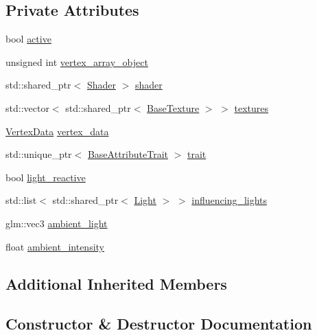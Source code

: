 \subsection*{Private Attributes}
\begin{DoxyCompactItemize}
\item 
bool \hyperlink{class_graphics_1_1_renderable_a5ee90a804fea73ddfaeed77086ecead4}{active}
\item 
unsigned int \hyperlink{class_graphics_1_1_renderable_aabfa91ebff7b10decd54119d663044ef}{vertex\+\_\+array\+\_\+object}
\item 
std\+::shared\+\_\+ptr$<$ \hyperlink{class_graphics_1_1_shader}{Shader} $>$ \hyperlink{class_graphics_1_1_renderable_a6c951dfc9a00d3f3f79550112d0f40e3}{shader}
\item 
std\+::vector$<$ std\+::shared\+\_\+ptr$<$ \hyperlink{class_graphics_1_1_base_texture}{Base\+Texture} $>$ $>$ \hyperlink{class_graphics_1_1_renderable_ac3a09a4fbb226022792d8abf07ff549a}{textures}
\item 
\hyperlink{class_graphics_1_1_vertex_data}{Vertex\+Data} \hyperlink{class_graphics_1_1_renderable_a5077fe6a71021f0bd4ebc8d24cdf544b}{vertex\+\_\+data}
\item 
std\+::unique\+\_\+ptr$<$ \hyperlink{class_graphics_1_1_base_attribute_trait}{Base\+Attribute\+Trait} $>$ \hyperlink{class_graphics_1_1_renderable_a27f39fbb4866ccfc83f0662a59c03020}{trait}
\item 
bool \hyperlink{class_graphics_1_1_renderable_a4a0fd8d55a1881c2b41e854ddb78366a}{light\+\_\+reactive}
\item 
std\+::list$<$ std\+::shared\+\_\+ptr$<$ \hyperlink{class_graphics_1_1_light}{Light} $>$ $>$ \hyperlink{class_graphics_1_1_renderable_a45bf29c03f8d47d870c6a1ce44126007}{influencing\+\_\+lights}
\item 
glm\+::vec3 \hyperlink{class_graphics_1_1_renderable_aecd9a143f7abb6c6b4969c147ee245c3}{ambient\+\_\+light}
\item 
float \hyperlink{class_graphics_1_1_renderable_a52fb337984cab44bb827037c9c13956e}{ambient\+\_\+intensity}
\end{DoxyCompactItemize}
\subsection*{Additional Inherited Members}


\subsection{Constructor \& Destructor Documentation}
\hypertarget{class_graphics_1_1_renderable_a2c99d41631558194811f6f4c61a7f464}{}
